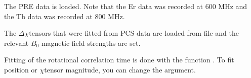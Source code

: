 \documentclass[a4paper,10pt,english,openany,oneside]{sphinxmanual}
\begin{document}
\sphinxAtStartPar
The PRE data is loaded. Note that the Er data was recorded at 600 MHz and the Tb data was recorded at 800 MHz.

\begin{sphinxVerbatim}[commandchars=\\\{\}]
  
  
\end{sphinxVerbatim}

\sphinxAtStartPar
The \({\Delta\chi}\)\sphinxhyphen{}tensors that were fitted from PCS data are loaded from file and the relevant \({B_0}\) magnetic field strengths are set.

\begin{sphinxVerbatim}[commandchars=\\\{\}]
  
  
  
  
\end{sphinxVerbatim}

\sphinxAtStartPar
Fitting of the rotational correlation time is done with the function {\hyperref[\detokenize{reference/generated/paramagpy.fit.nlr_fit_metal_from_pre:paramagpy.fit.nlr_fit_metal_from_pre}]{}}. To fit position or \({\chi}\)\sphinxhyphen{}tensor magnitude, you can change the  argument.
\end{document}
